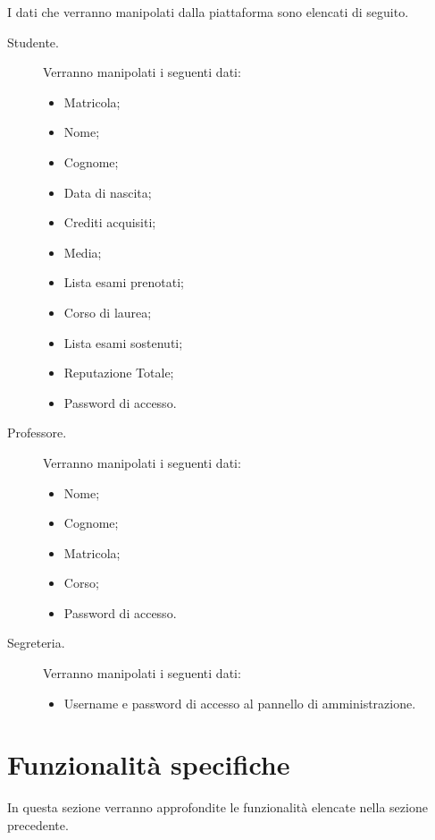 \documentclass [a4paper,11pt]{book}
\begin{document}
I dati che verranno manipolati dalla piattaforma sono elencati di seguito.
\begin{description}
\item[Studente.] Verranno manipolati i seguenti dati:

\begin{itemize}
\item Matricola;
\item Nome;
\item Cognome;
\item Data di nascita;
\item Crediti acquisiti;
\item Media;
\item Lista esami prenotati; 
\item Corso di laurea;
\item Lista esami sostenuti;
\item Reputazione Totale;
\item Password di accesso.
\end{itemize}

\item[Professore.] Verranno manipolati i seguenti dati:

\begin{itemize}
\item Nome;
\item Cognome;
\item Matricola;
\item Corso;	%
\item Password di accesso.
\end{itemize}

\item[Segreteria.] Verranno manipolati i seguenti dati:
\begin{itemize}
\item Username e password di accesso al pannello di amministrazione.
\end{itemize}


\end{description}

\medskip
\medskip

\section{Funzionalità specifiche}

In questa sezione verranno approfondite le funzionalità elencate nella sezione precedente.
\end{document}
